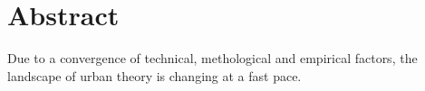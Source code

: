 

\begingroup
\let\clearpage\relax
\let\cleardoublepage\relax
\let\cleardoublepage\relax

\chapter*{Abstract} %

Due to a convergence of technical, methological and empirical factors, the
landscape of urban theory is changing at a fast pace. 


\endgroup			

\vfill
